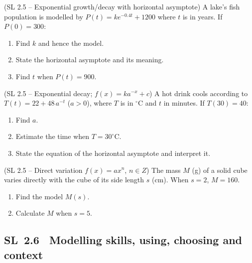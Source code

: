 \documentclass[11pt]{article}
\def\textit#1{#1}%
\def\mathbb#1{#1}%
\newcommand{\tocsubsection}[1]{\subsection{#1}}
\newcounter{question}
\begin{document}
\begin{question}
\textit{(SL 2.5 – Exponential growth/decay with horizontal asymptote)}
A lake’s fish population is modelled by $P(t)=k e^{-0.4t}+1200$ where $t$ is in years. If $P(0)=300$:
\begin{enumerate}
  \item Find $k$ and hence the model.
  \item State the horizontal asymptote and its meaning.
  \item Find $t$ when $P(t)=900$.
\end{enumerate}
\end{question}

\begin{question}
\textit{(SL 2.5 – Exponential decay; $f(x)=ka^{-x}+c$)}
A hot drink cools according to $T(t)=22+48\,a^{-t}$ ($a>0$), where $T$ is in $^\circ$C and $t$ in minutes. If $T(30)=40$:
\begin{enumerate}
  \item Find $a$.
  \item Estimate the time when $T=30^\circ$C.
  \item State the equation of the horizontal asymptote and interpret it.
\end{enumerate}
\end{question}

\begin{question}
\textit{(SL 2.5 – Direct variation $f(x)=ax^n$, $n\in\mathbb Z$)}
The mass $M$ (g) of a solid cube varies directly with the cube of its side length $s$ (cm). When $s=2$, $M=160$.
\begin{enumerate}
  \item Find the model $M(s)$.
  \item Calculate $M$ when $s=5$.
\end{enumerate}
\end{question}






















\tocsubsection{SL 2.6 \; Modelling skills, using, choosing and context}

\end{document}
